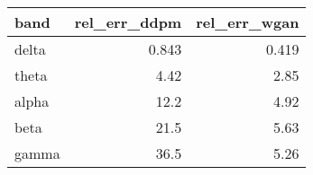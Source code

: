 \begin{tabular}{lrr}
\toprule
band & rel_err_ddpm & rel_err_wgan \\
\midrule
delta & 0.843 & 0.419 \\
theta & 4.42 & 2.85 \\
alpha & 12.2 & 4.92 \\
beta & 21.5 & 5.63 \\
gamma & 36.5 & 5.26 \\
\bottomrule
\end{tabular}
